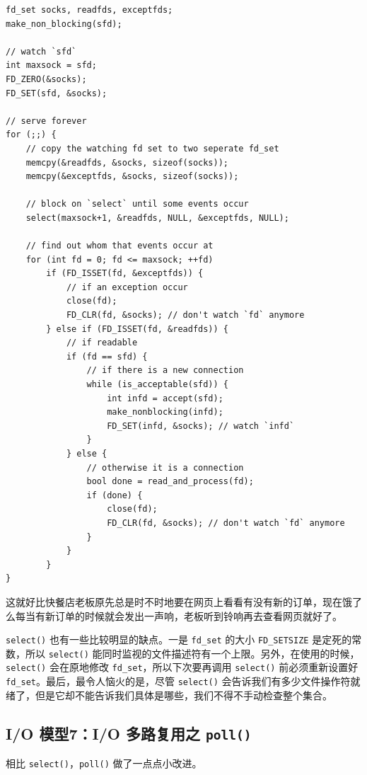 \documentclass[a4paper]{article}
\begin{document}
\begin{verbatim}
fd_set socks, readfds, exceptfds;
make_non_blocking(sfd);

// watch `sfd`
int maxsock = sfd;
FD_ZERO(&socks);
FD_SET(sfd, &socks);

// serve forever
for (;;) {
    // copy the watching fd set to two seperate fd_set
    memcpy(&readfds, &socks, sizeof(socks));
    memcpy(&exceptfds, &socks, sizeof(socks));

    // block on `select` until some events occur
    select(maxsock+1, &readfds, NULL, &exceptfds, NULL);

    // find out whom that events occur at
    for (int fd = 0; fd <= maxsock; ++fd)
        if (FD_ISSET(fd, &exceptfds)) {
            // if an exception occur
            close(fd);
            FD_CLR(fd, &socks); // don't watch `fd` anymore
        } else if (FD_ISSET(fd, &readfds)) {
            // if readable
            if (fd == sfd) {
                // if there is a new connection
                while (is_acceptable(sfd)) {
                    int infd = accept(sfd);
                    make_nonblocking(infd);
                    FD_SET(infd, &socks); // watch `infd`
                }
            } else {
                // otherwise it is a connection
                bool done = read_and_process(fd);
                if (done) {
                    close(fd);
                    FD_CLR(fd, &socks); // don't watch `fd` anymore
                }
            }
        }
}
\end{verbatim}

这就好比快餐店老板原先总是时不时地要在网页上看看有没有新的订单，现在饿了么每当有新订单的时候就会发出一声响，老板听到铃响再去查看网页就好了。

\texttt{select()} 也有一些比较明显的缺点。一是 \texttt{fd\_set} 的大小 \texttt{FD\_SETSIZE} 是定死的常数，所以 \texttt{select()} 能同时监视的文件描述符有一个上限。另外，在使用的时候，\texttt{select()} 会在原地修改 \texttt{fd\_set}，所以下次要再调用 \texttt{select()} 前必须重新设置好 \texttt{fd\_set}。最后，最令人恼火的是，尽管 \texttt{select()} 会告诉我们有多少文件操作符就绪了，但是它却不能告诉我们具体是哪些，我们不得不手动检查整个集合。

\subsection{I/O 模型7：I/O 多路复用之 \texttt{poll()}}

相比 \texttt{select()}，\texttt{poll()} 做了一点点小改进。
\end{document}
